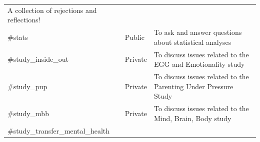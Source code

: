 \documentclass[]{book}
\begin{document}
\begin{longtable}[]{@{}lll@{}}
\begin{minipage}[t]{0.70\columnwidth}
A collection of rejections and reflections!\strut
\end{minipage}\tabularnewline
\begin{minipage}[t]{0.18\columnwidth}\raggedright
\#stats\strut
\end{minipage} & \begin{minipage}[t]{0.04\columnwidth}\raggedright
Public\strut
\end{minipage} & \begin{minipage}[t]{0.70\columnwidth}\raggedright
To ask and answer questions about statistical analyses\strut
\end{minipage}\tabularnewline
\begin{minipage}[t]{0.18\columnwidth}\raggedright
\#study\_inside\_out\strut
\end{minipage} & \begin{minipage}[t]{0.04\columnwidth}\raggedright
Private\strut
\end{minipage} & \begin{minipage}[t]{0.70\columnwidth}\raggedright
To discuss issues related to the EGG and Emotionality study\strut
\end{minipage}\tabularnewline
\begin{minipage}[t]{0.18\columnwidth}\raggedright
\#study\_pup\strut
\end{minipage} & \begin{minipage}[t]{0.04\columnwidth}\raggedright
Private\strut
\end{minipage} & \begin{minipage}[t]{0.70\columnwidth}\raggedright
To discuss issues related to the Parenting Under Pressure Study\strut
\end{minipage}\tabularnewline
\begin{minipage}[t]{0.18\columnwidth}\raggedright
\#study\_mbb\strut
\end{minipage} & \begin{minipage}[t]{0.04\columnwidth}\raggedright
Private\strut
\end{minipage} & \begin{minipage}[t]{0.70\columnwidth}\raggedright
To discuss issues related to the Mind, Brain, Body study\strut
\end{minipage}\tabularnewline
\begin{minipage}[t]{0.18\columnwidth}\raggedright
\#study\_transfer\_mental\_health\strut
\end{minipage} & \begin{minipage}[t]{0.04\columnwidth}\raggedright

\end{minipage}
\end{longtable}
\end{document}
